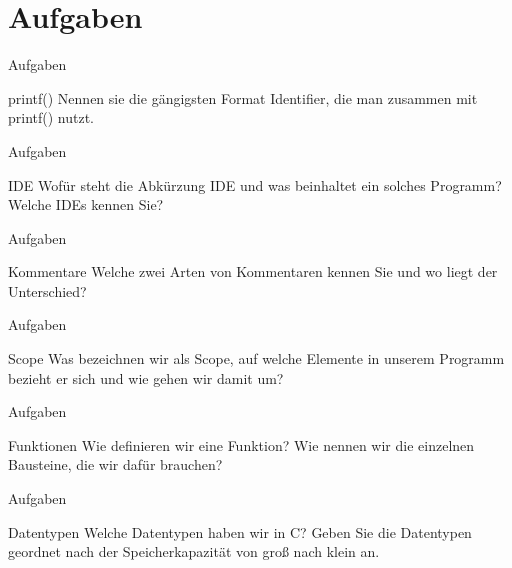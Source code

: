 \documentclass[usenames,dvipsnames,10pt]{beamer}
\begin{document}
    \section{Aufgaben}
    \begin{frame}{Aufgaben}
        \begin{block}{printf()}
            Nennen sie die gängigsten Format Identifier, die man zusammen 
            mit printf() nutzt.
        \end{block}
    \end{frame}
    \begin{frame}{Aufgaben}
        \begin{block}{IDE}
            Wofür steht die Abkürzung IDE und was beinhaltet ein solches Programm? Welche 
            IDEs kennen Sie?
        \end{block}
    \end{frame}
    \begin{frame}{Aufgaben}
        \begin{block}{Kommentare}
            Welche zwei Arten von Kommentaren kennen Sie und wo liegt der Unterschied?
        \end{block}
    \end{frame}
    \begin{frame}{Aufgaben}
        \begin{block}{Scope}
            Was bezeichnen wir als Scope, auf welche Elemente in unserem Programm bezieht er sich und
            wie gehen wir damit um?
        \end{block}
    \end{frame}

    \begin{frame}{Aufgaben}
        \begin{block}{Funktionen}
            Wie definieren wir eine Funktion? Wie nennen wir die einzelnen Bausteine, die wir dafür brauchen?
        \end{block}
    \end{frame}
    \begin{frame}{Aufgaben}
        \begin{block}{Datentypen}
            Welche Datentypen haben wir in C? Geben Sie die Datentypen geordnet nach der Speicherkapazität von
            groß nach klein an.
        \end{block}
    \end{frame}

    
\end{document}
